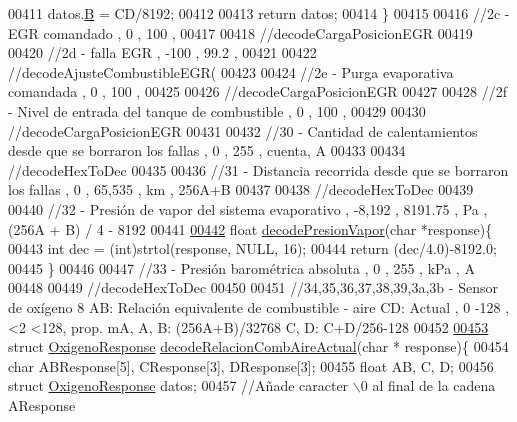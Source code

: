 \begin{DoxyCode}
{{{00411     datos.\hyperlink{structOxigenoResponse_a96b19152dd001e19d1351e2d97f22736}{B} = CD/8192; 
00412     
00413     \textcolor{keywordflow}{return} datos;
00414 \}
00415 
00416 \textcolor{comment}{//2c - EGR comandado , 0 , 100 , %
00417 
00418 \textcolor{comment}{//decodeCargaPosicionEGR}
00419 
00420 \textcolor{comment}{//2d - falla EGR , -100 , 99.2 , %
00421 
00422 \textcolor{comment}{//decodeAjusteCombustibleEGR(}
00423 
00424 \textcolor{comment}{//2e - Purga evaporativa comandada , 0 , 100 , %
00425 
00426 \textcolor{comment}{//decodeCargaPosicionEGR}
00427 
00428 \textcolor{comment}{//2f - Nivel de entrada del tanque de combustible , 0 , 100 , %
00429 
00430 \textcolor{comment}{//decodeCargaPosicionEGR}
00431 
00432 \textcolor{comment}{//30 - Cantidad de calentamientos desde que se borraron los fallas , 0 , 255 , cuenta, A}
00433 
00434 \textcolor{comment}{//decodeHexToDec}
00435 
00436 \textcolor{comment}{//31 - Distancia recorrida desde que se borraron los fallas , 0 , 65,535 , km , 256A+B}
00437 
00438 \textcolor{comment}{//decodeHexToDec}
00439 
00440 \textcolor{comment}{//32 - Presión de vapor del sistema evaporativo , -8,192 , 8191.75 , Pa , (256A + B) / 4 - 8192 }
00441 
\hyperlink{decoders_8hpp_ab86bda1fcefda784e048796e2d892475}{00442} \textcolor{keywordtype}{float} \hyperlink{decoders_8cpp_ab86bda1fcefda784e048796e2d892475}{decodePresionVapor}(\textcolor{keywordtype}{char} *response)\{
00443     \textcolor{keywordtype}{int} dec = (int)strtol(response, NULL, 16);
00444     \textcolor{keywordflow}{return} (dec/4.0)-8192.0;
00445 \}
00446 
00447 \textcolor{comment}{//33 - Presión barométrica absoluta , 0 , 255 , kPa , A}
00448 
00449 \textcolor{comment}{//decodeHexToDec}
00450 
00451 \textcolor{comment}{//34,35,36,37,38,39,3a,3b - Sensor de oxígeno 8 AB: Relación equivalente de combustible - aire CD: Actual ,
       0 -128 , <2 <128, prop. mA, A, B: (256A+B)/32768 C, D: C+D/256-128 }
00452 
\hyperlink{decoders_8hpp_a4cedb500095b25b3d4fff382094b0eb9}{00453} \textcolor{keyword}{struct }\hyperlink{structOxigenoResponse}{OxigenoResponse} \hyperlink{decoders_8cpp_a4cedb500095b25b3d4fff382094b0eb9}{decodeRelacionCombAireActual}(char *
      response)\{
00454     \textcolor{keywordtype}{char} ABResponse[5], CResponse[3], DResponse[3];
00455     \textcolor{keywordtype}{float} AB, C, D;
00456     \textcolor{keyword}{struct }\hyperlink{structOxigenoResponse}{OxigenoResponse} datos; 
00457     \textcolor{comment}{//Añade caracter \(\backslash\)0 al final de la cadena AResponse}
}}}}}}}
\end{DoxyCode}

